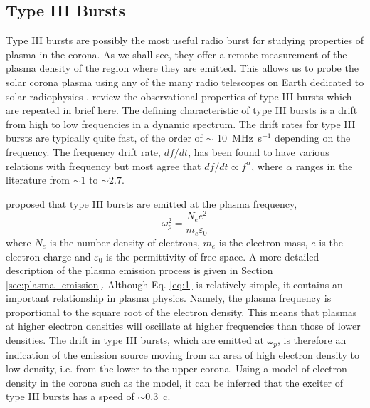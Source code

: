 \subsection{Type III Bursts}
\label{sec:typeIII} 
Type III bursts are possibly the most useful radio burst for studying properties of plasma in the corona. As we shall see, they offer a remote measurement of the plasma density of the region where they are emitted. This allows us to probe the solar corona plasma using any of the many radio telescopes on Earth dedicated to solar radiophysics \citep[e.g.][]{Benz2004}.
\cite{Reid2014} review the observational properties of type III bursts which are repeated in brief here. The defining characteristic of type III bursts is a drift from high to low frequencies in a dynamic spectrum. The drift rates for type III bursts are typically quite fast, of the order of $\sim$ 10~MHz~s$^{-1}$ depending on the frequency. The frequency drift rate, $df/dt$, has been found to have various relations with frequency \citep{Reid2014} but most agree that $df/dt \propto f^{\alpha}$, where $\alpha$ ranges in the literature from $\sim 1$ to $\sim 2.7$. 

\cite{Ginzburg1958} proposed that type III bursts are emitted at the plasma frequency,
\begin{equation}\label{eq:1}
    \omega_{p}^2 = \frac{N_e e^2}{m_e \varepsilon_0}
\end{equation}
where $N_e$ is the number density of electrons, $m_e$ is the electron mass, $e$ is the electron charge and $\varepsilon_0$ is the permittivity of free space. A more detailed description of the plasma emission process is given in Section \ref{sec:plasma_emission}.
Although Eq. \ref{eq:1} is relatively simple, it contains an important relationship in plasma physics. Namely, the plasma frequency is proportional to the square root of the electron density. This means that plasmas at higher electron densities will oscillate at higher frequencies than those of lower densities. The drift in type III bursts, which are emitted at $\omega_p$, is therefore an indication of the emission source moving from an area of high electron density to low density, i.e. from the lower to the upper corona. Using a model of electron density in the corona such as the \cite{Newkirk1961} model, it can be inferred that the exciter of type III bursts has a speed of $\sim 0.3$~c.

